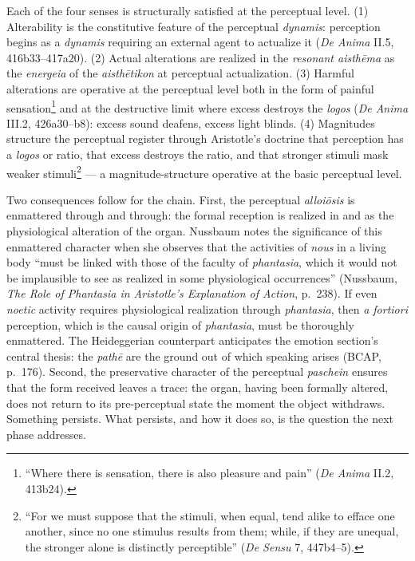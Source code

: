 \documentclass{article}
\begin{document}
Each of the four senses is structurally satisfied at the perceptual level. (1) Alterability is the constitutive feature of the perceptual \textit{dynamis}: perception begins as a \textit{dynamis} requiring an external agent to actualize it (\textit{De Anima} II.5, 416b33--417a20). (2) Actual alterations are realized in the \textit{resonant aisthēma} as the \textit{energeia} of the \textit{aisthētikon} at perceptual actualization. (3) Harmful alterations are operative at the perceptual level both in the form of painful sensation\footnote{``Where there is sensation, there is also pleasure and pain'' (\textit{De Anima} II.2, 413b24).} and at the destructive limit where excess destroys the \textit{logos} (\textit{De Anima} III.2, 426a30--b8): excess sound deafens, excess light blinds. (4) Magnitudes structure the perceptual register through Aristotle's doctrine that perception has a \textit{logos} or ratio, that excess destroys the ratio, and that stronger stimuli mask weaker stimuli\footnote{``For we must suppose that the stimuli, when equal, tend alike to efface one another, since no one stimulus results from them; while, if they are unequal, the stronger alone is distinctly perceptible'' (\textit{De Sensu} 7, 447b4--5).} --- a magnitude-structure operative at the basic perceptual level.

Two consequences follow for the chain. First, the perceptual \textit{alloiōsis} is enmattered through and through: the formal reception is realized in and as the physiological alteration of the organ. Nussbaum notes the significance of this enmattered character when she observes that the activities of \textit{nous} in a living body ``must be linked with those of the faculty of \textit{phantasia}, which it would not be implausible to see as realized in some physiological occurrences'' (Nussbaum, \textit{The Role of Phantasia in Aristotle's Explanation of Action}, p.~238). If even \textit{noetic} activity requires physiological realization through \textit{phantasia}, then \textit{a fortiori} perception, which is the causal origin of \textit{phantasia}, must be thoroughly enmattered. The Heideggerian counterpart anticipates the emotion section's central thesis: the \textit{pathē} are the ground out of which speaking arises (BCAP, p.~176). Second, the preservative character of the perceptual \textit{paschein} ensures that the form received leaves a trace: the organ, having been formally altered, does not return to its pre-perceptual state the moment the object withdraws. Something persists. What persists, and how it does so, is the question the next phase addresses.
\end{document}
